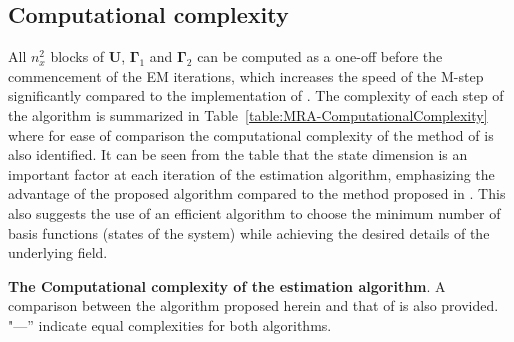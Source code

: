 \documentclass[review,authoryear,3p]{elsarticle}
\begin{document}
\subsection{Computational complexity} 
All $n_x^2$ blocks of $\mathbf U$, $\boldsymbol\Gamma_1$ and $\boldsymbol\Gamma_2$  can be computed as a one-off before the commencement of the EM iterations, which increases the speed of the M-step significantly compared to the implementation of \citet{Dewar2009}. The complexity of each step of the algorithm is summarized in Table~\ref{table:MRA-ComputationalComplexity} where for ease of comparison the computational complexity of the method of \citet{Dewar2009} is also identified. It can be seen from the table that the state dimension is an important factor at each iteration of the estimation algorithm, emphasizing the advantage of the proposed algorithm compared to the method proposed in \citet{Dewar2009}. This also suggests the use of an efficient algorithm to choose the minimum number of basis functions (states of the system) while achieving the desired details of the underlying field.  
\begin {table}
\begin{center}
 \caption {{\bf The Computational complexity of the estimation algorithm}. A comparison between the algorithm proposed herein and that of \citet{Dewar2009} is also provided. "\----'' indicate equal complexities for both algorithms.} 
\label{table:MRA-ComputationalComplexity}
\end{center}
\end {table} 
\end{document}
